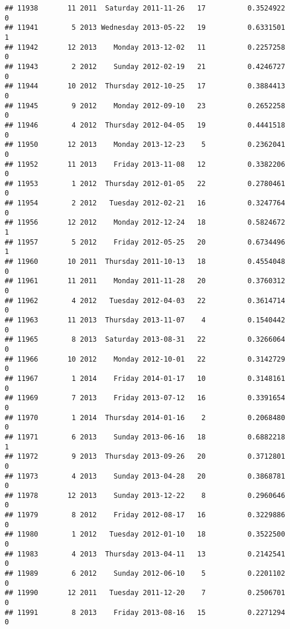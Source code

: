 \documentclass[
]{article}
\begin{document}
\begin{verbatim}
## 11938       11 2011  Saturday 2011-11-26   17          0.3524922             0
## 11941        5 2013 Wednesday 2013-05-22   19          0.6331501             1
## 11942       12 2013    Monday 2013-12-02   11          0.2257258             0
## 11943        2 2012    Sunday 2012-02-19   21          0.4246727             0
## 11944       10 2012  Thursday 2012-10-25   17          0.3884413             0
## 11945        9 2012    Monday 2012-09-10   23          0.2652258             0
## 11946        4 2012  Thursday 2012-04-05   19          0.4441518             0
## 11950       12 2013    Monday 2013-12-23    5          0.2362041             0
## 11952       11 2013    Friday 2013-11-08   12          0.3382206             0
## 11953        1 2012  Thursday 2012-01-05   22          0.2780461             0
## 11954        2 2012   Tuesday 2012-02-21   16          0.3247764             0
## 11956       12 2012    Monday 2012-12-24   18          0.5824672             1
## 11957        5 2012    Friday 2012-05-25   20          0.6734496             1
## 11960       10 2011  Thursday 2011-10-13   18          0.4554048             0
## 11961       11 2011    Monday 2011-11-28   20          0.3760312             0
## 11962        4 2012   Tuesday 2012-04-03   22          0.3614714             0
## 11963       11 2013  Thursday 2013-11-07    4          0.1540442             0
## 11965        8 2013  Saturday 2013-08-31   22          0.3266064             0
## 11966       10 2012    Monday 2012-10-01   22          0.3142729             0
## 11967        1 2014    Friday 2014-01-17   10          0.3148161             0
## 11969        7 2013    Friday 2013-07-12   16          0.3391654             0
## 11970        1 2014  Thursday 2014-01-16    2          0.2068480             0
## 11971        6 2013    Sunday 2013-06-16   18          0.6882218             1
## 11972        9 2013  Thursday 2013-09-26   20          0.3712801             0
## 11973        4 2013    Sunday 2013-04-28   20          0.3868781             0
## 11978       12 2013    Sunday 2013-12-22    8          0.2960646             0
## 11979        8 2012    Friday 2012-08-17   16          0.3229886             0
## 11980        1 2012   Tuesday 2012-01-10   18          0.3522500             0
## 11983        4 2013  Thursday 2013-04-11   13          0.2142541             0
## 11989        6 2012    Sunday 2012-06-10    5          0.2201102             0
## 11990       12 2011   Tuesday 2011-12-20    7          0.2506701             0
## 11991        8 2013    Friday 2013-08-16   15          0.2271294             0

\end{verbatim}
\end{document}
